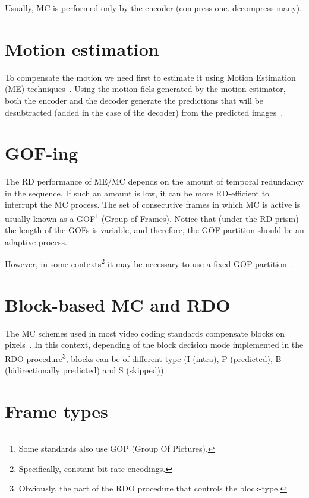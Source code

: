 Usually, MC is performed only by the encoder (compress one. decompress
many).


\section{Motion estimation}

To compensate the motion we need first to estimate it using Motion
Estimation (ME) techniques~\cite{vruiz__ME}. Using the motion fiels
generated by the motion estimator, both the encoder and the decoder
generate the predictions that will be desubtracted (added in the case
of the decoder) from the predicted images~\cite{vruiz__MC}.


\section{GOF-ing}

The RD performance of ME/MC depends on the amount of temporal
redundancy in the sequence. If such an amount is low, it can be more
RD-efficient to interrupt the MC process. The set of consecutive
frames in which MC is active is usually known as a GOF\footnote{Some
  standards also use GOP (Group Of Pictures).} (Group of
Frames). Notice that (under the RD prism) the length of the GOFs is
variable, and therefore, the GOF partition should be an adaptive
process.

However, in some contexts\footnote{Specifically, constant bit-rate
encodings.} it may be necessary to use a fixed GOP
partition~\cite{vruiz__MC}.

\section{Block-based MC and RDO}

The MC schemes used in most video coding standards compensate blocks
on pixels~\cite{vruiz__ME}. In this context, depending of the block
decision mode implemented in the RDO procedure\footnote{Obviously, the
  part of the RDO procedure that controls the block-type.}, blocks can
be of different type (I (intra), P (predicted), B
(bidirectionally predicted) and S (skipped))~\cite{vruiz__MC}.

\section{Frame types}

